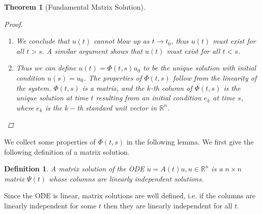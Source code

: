 \documentclass{article}
\newtheorem{theorem}{Theorem}[section]
\newtheorem{definition}{Definition}[section]
\def\R{{\mathbb R}}
\begin{document}
\begin{theorem}[Fundamental Matrix Solution]
\begin{proof}
\begin{enumerate}
\begin{align*}
&\leq |u_0| \exp \left( \int_s^{t_0} ||A(\tau)|| d\tau \right) \\.&\leq C |u_0|
\end{align*}
where the bound holds uniformly for $t \in [s, t_0)$ since it does not depend on $t$.
\item We conclude that $u(t)$ cannot blow up as $t \rightarrow t_0$, thus $u(t)$ must exist for all $t > s$. A similar argument shows that $u(t)$ must exist for all $t < s$.
\item Thus we can define $u(t) = \Phi(t, s)u_0$ to be the unique solution with initial condition $u(s) = u_0$. The properties of $\Phi(t,s)$ follow from the linearity of the system. $\Phi(t,s)$ is a matrix, and the $k$-th column of $\Phi(t,s)$ is the unique solution at time $t$ resulting from an initial condition $e_k$ at time $s$, where $e_k$ is the $k-$th standard unit vector in $\R^n$. 
\end{enumerate}
\end{proof}
\end{theorem}

We collect some properties of $\Phi(t,s)$ in the following lemma. We first give the following definition of a matrix solution.\\

\begin{definition}A \emph{matrix solution} of the ODE $\dot{u} = A(t)u, u \in \R^n$ is a $n \times n$ matrix $\Psi(t)$ whose columns are linearly independent solutions.
\end{definition}

Since the ODE is linear, matrix solutions are well defined, i.e. if the columns are linearly independent for some $t$ then they are linearly independent for all $t$.\\
\end{document}
